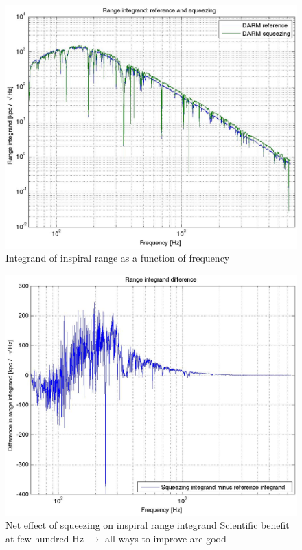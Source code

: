 \begin{figure}
\includegraphics[height=0.5\paperheight, width=0.5\paperwidth,keepaspectratio]{range_integrand.eps}
\caption{Integrand of inspiral range as a function of frequency}
\end{figure}
\begin{figure}
\includegraphics[height=0.5\paperheight, width=0.5\paperwidth,keepaspectratio]{range_integrand_difference.eps}
\caption{Net effect of squeezing on inspiral range integrand
\newline Scientific benefit at few hundred Hz $\rightarrow$ all ways to improve are good
}
\end{figure}




